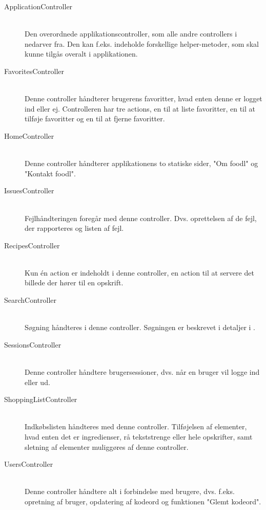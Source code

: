 \begin{description}
  \item[ApplicationController] \hfill \\ 
  Den overordnede applikationscontroller, som alle andre controllers i \Foodl{} nedarver fra. Den kan f.eks. indeholde forskellige helper-metoder, som skal kunne tilgås overalt i applikationen.

  \item[FavoritesController] \hfill \\ 
  Denne controller håndterer brugerens favoritter, hvad enten denne er logget ind eller ej. Controlleren har tre actions, en til at liste favoritter, en til at tilføje favoritter og en til at fjerne favoritter.

  \item[HomeController] \hfill \\ 
  Denne controller håndterer applikationens to statiske sider, "Om foodl" og "Kontakt foodl".

  \item[IssuesController] \hfill \\ 
  Fejlhåndteringen foregår med denne controller. Dvs. oprettelsen af de fejl, der rapporteres og listen af fejl.

  \item[RecipesController] \hfill \\
  Kun én action er indeholdt i denne controller, en action til at servere det billede der hører til en opskrift.

  \item[SearchController] \hfill \\
  Søgning håndteres i denne controller. Søgningen er beskrevet i detaljer i .

  \item[SessionsController] \hfill \\
  Denne controller håndtere brugersessioner, dvs. når en bruger vil logge ind eller ud.

  \item[ShoppingListController] \hfill \\
  Indkøbslisten håndteres med denne controller. Tilføjelsen af elementer, hvad enten det er ingredienser, rå tekststrenge eller hele opskrifter, samt sletning af elementer muliggøres af denne controller.

  \item[UsersController] \hfill \\
  Denne controller håndtere alt i forbindelse med brugere, dvs. f.eks. opretning af bruger, opdatering af kodeord og funktionen "Glemt kodeord".

\end{description}

